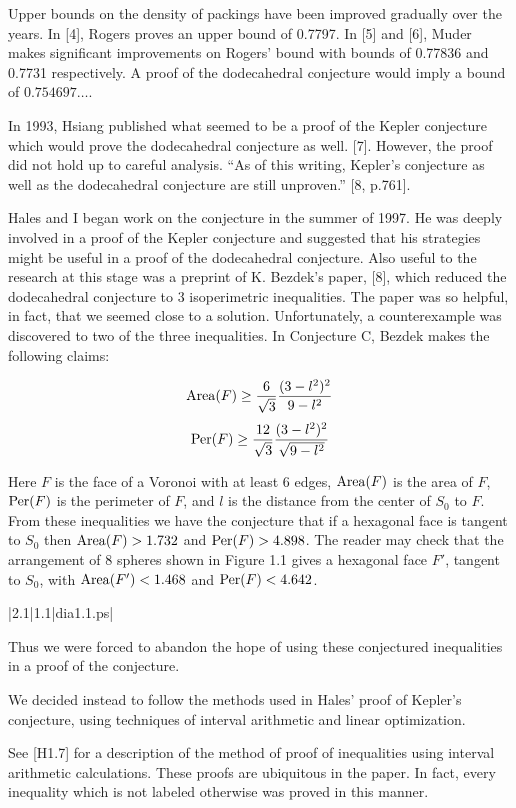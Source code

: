 Upper bounds on the density of packings have been improved gradually
over the years.  In [4], Rogers proves an upper bound of 0.7797.  In [5] and [6], 
Muder makes significant improvements on Rogers' bound with bounds of 
0.77836 and 0.7731 respectively.  A proof of the dodecahedral conjecture 
would imply a bound of $0.754697\dots$.


In 1993, Hsiang published what seemed to be a proof of the Kepler conjecture which would prove the 
dodecahedral conjecture as well. [7].  However, the proof did not hold up to
 careful analysis.  ``As of this writing, Kepler's conjecture as well as the 
dodecahedral conjecture are still unproven.'' [8, p.761].

Hales and I began work on the conjecture in the summer of 1997.  He was deeply 
involved in a proof of the Kepler conjecture and suggested that his strategies 
might be useful in a proof of the dodecahedral conjecture.  Also useful to the 
research at this stage was a preprint of K. Bezdek's paper, [8], which reduced 
the dodecahedral conjecture to 3 isoperimetric inequalities.  The paper was so helpful,
 in fact, that we seemed close to a solution.  Unfortunately, a counterexample 
was discovered to two of the three inequalities.  In Conjecture C, 
Bezdek makes the following claims:


$$\operatorname{Area}(F)\ge \frac 6 {\sqrt3} \frac {(3-l^2)^2}{9-l^2}$$
$$\operatorname{Per}(F)\ge\frac {12} {\sqrt3} \frac {(3-l^2)^2}{\sqrt{9-l^2}}$$

Here $F$ is the face of a Voronoi with at least 6 edges, $\operatorname{Area}(F)$ 
is the area of $F$, $\operatorname{Per}(F)$ is the perimeter of $F$, and $l$ is the distance 
from the center of $S_0$ to $F$.  From these inequalities we have the conjecture
 that if a hexagonal face is tangent to $S_0$ then $\operatorname{Area}(F) > 1.732$ and 
$\operatorname{Per}(F)>4.898$.  The reader may check that the arrangement of 8 spheres shown 
in Figure 1.1 gives a hexagonal face $F'$, tangent to $S_0$, with $\operatorname{Area}(F')<1.468$
 and $\operatorname{Per}(F)<4.642$.  
	
\gram|2.1|1.1|dia1.1.ps|  %


Thus we were forced to abandon the hope of using these conjectured inequalities 
in a proof of the conjecture.
	
We decided instead to follow the methods used in Hales' proof of Kepler's 
conjecture, using techniques of interval arithmetic and linear optimization.

See [H1.7] for a description of the method of proof of inequalities using interval arithmetic calculations.  These proofs are ubiquitous in the paper.  
In fact, every inequality which is not labeled otherwise was proved in this manner.  



